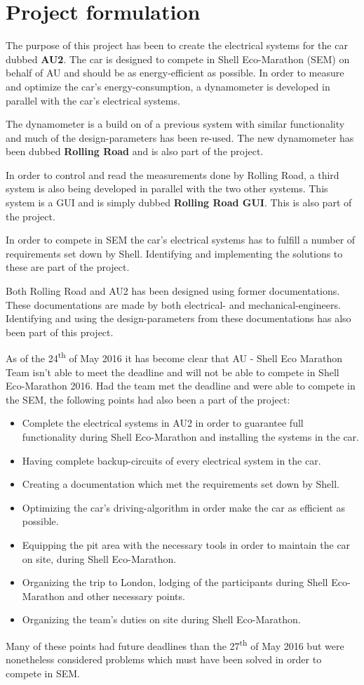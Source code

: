 \chapter{Project formulation}
The purpose of this project has been to create the electrical systems for the car dubbed \textbf{AU2}. The car is designed to compete in Shell Eco-Marathon (SEM) on behalf of AU and should be as energy-efficient as possible. In order to measure and optimize the car's energy-consumption, a dynamometer is developed in parallel with the car's electrical systems. 

The dynamometer is a build on of a previous system with similar functionality\cite{BAC_rullefelt} and much of the design-parameters has been re-used. The new dynamometer has been dubbed \textbf{Rolling Road} and is also part of the project.

In order to control and read the measurements done by Rolling Road, a third system is also being developed in parallel with the two other systems. This system is a GUI and is simply dubbed \textbf{Rolling Road GUI}. This is also part of the project.

In order to compete in SEM the car's electrical systems has to fulfill a number of requirements set down by Shell. Identifying and implementing the solutions to these are part of the project.

Both Rolling Road and AU2 has been designed using former documentations. These documentations are made by both electrical- and mechanical-engineers. Identifying and using the design-parameters from these documentations has also been part of this project.

As of the 24\textsuperscript{th} of May 2016 it has become clear that AU - Shell Eco Marathon Team isn't able to meet the deadline and will not be able to compete in Shell Eco-Marathon 2016. Had the team met the deadline and were able to compete in the SEM, the following points had also been a part of the project:
\begin{itemize}
	\item Complete the electrical systems in AU2 in order to guarantee full functionality during Shell Eco-Marathon and installing the systems in the car.
	\item Having complete backup-circuits of every electrical system in the car.
	\item Creating a documentation which met the requirements set down by Shell.
	\item Optimizing the car's driving-algorithm in order make the car as efficient as possible.
	\item Equipping the pit area with the necessary tools in order to maintain the car on site, during Shell Eco-Marathon.
	\item Organizing the trip to London, lodging of the participants during Shell Eco-Marathon and other necessary points.
	\item Organizing the team's duties on site during Shell Eco-Marathon.
\end{itemize}
Many of these points had future deadlines than the 27\textsuperscript{th} of May 2016 but were nonetheless considered problems which must have been solved in order to compete in SEM.